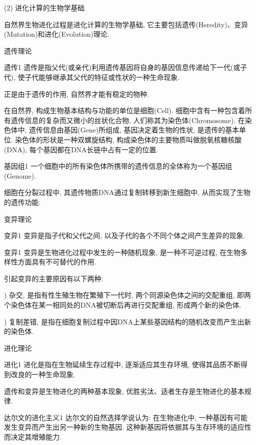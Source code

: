   (2) 进化计算的生物学基础

  自然界生物进化过程是进化计算的生物学基础, 它主要包括遗传(Heredity)、变异(Mutation)和进化(Evolution)理论.

   遗传理论
\begin{mydef}{遗传}{1}
    遗传是指父代(或亲代)利用遗传基因将自身的基因信息传递给下一代(或子代), 使子代能够继承其父代的特征或性状的一种生命现象.
\end{mydef}
  正是由于遗传的作用, 自然界才能有稳定的物种.

  在自然界, 构成生物基本结构与功能的单位是细胞(Cell). 细胞中含有一种包含着所有遗传信息的复杂而又微小的丝状化合物, 人们称其为染色体(Chromosome).
  在染色体中, 遗传信息由基因(Gene)所组成, 基因决定着生物的性状, 是遗传的基本单位.
  染色体的形状是一种双螺旋结构, 构成染色体的主要物质叫做脱氧核糖核酸(DNA), 每个基因都在DNA长链中占有一定的位置.
    \begin{mydef}{基因组}{1}
        一个细胞中的所有染色体所携带的遗传信息的全体称为一个基因组(Genome).
    \end{mydef}
  细胞在分裂过程中, 其遗传物质DNA通过复制转移到新生细胞中, 从而实现了生物的遗传功能.

    变异理论

   \begin{mydef}{变异}{1}
    变异是指子代和父代之间, 以及子代的各个不同个体之间产生差异的现象.
    \end{mydef}
    \begin{mydef}{变异}{1}
        变异是生物进化过程中发生的一种随机现象, 是一种不可逆过程, 在生物多样性方面具有不可替代的作用.
    \end{mydef}
    引起变异的主要原因有以下两种:

    ) 杂交, 是指有性生殖生物在繁殖下一代时, 两个同源染色体之间的交配重组, 即两个染色体在某一相同处的DNA被切断后再进行交配重组, 形成两个新的染色体.

   ) 复制差错, 是指在细胞复制过程中因DNA上某些基因结构的随机改变而产生出新的染色体.

      进化理论
    \begin{mydef}{进化}{1}
        进化是指在生物延续生存过程中, 逐渐适应其生存环境, 使得其品质不断得到改良的一种生命现象.
    \end{mydef}

    遗传和变异是生物进化的两种基本现象, 优胜劣汰、适者生存是生物进化的基本规律.

    \begin{mydef}{达尔文的进化主义}{1}
         达尔文的自然选择学说认为: 在生物进化中, 一种基因有可能发生变异而产生出另一种新的生物基因. 这种新基因将依据其与生存环境的适应性而决定其增殖能力.
    \end{mydef}


